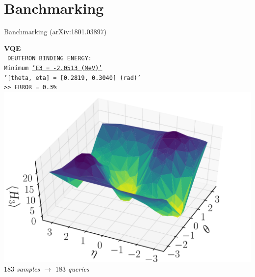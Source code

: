 \documentclass[9pt, handout, aspectratio=169]{beamer}	%
\begin{document}
\section{Banchmarking}

\begin{frame}{Banchmarking (arXiv:1801.03897)}

	\begin{multicols}{2}

		\begin{center}
			\textbf{VQE} \\
			\texttt{ \small
				DEUTERON BINDING ENERGY: \\
				Minimum \underline{'E3 = -2.0513 (MeV)'} \\
				'[theta, eta] = [0.2819, 0.3040] (rad)' \\
				>> ERROR = 0.3\% } \\
			\smallskip
			\includegraphics[width=.35\paperwidth]{Figures/deuteron-VQE} \\
			\smallskip
			\small{\emph{$183$ samples $\rightarrow$ $183$ queries}}
		\end{center}

		\columnbreak


\end{multicols}
\end{frame}
\end{document}
